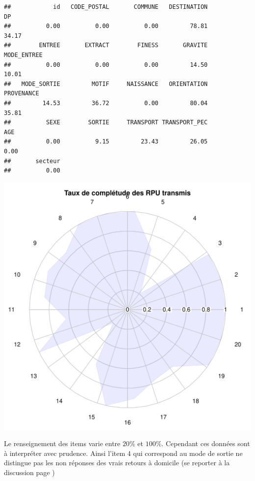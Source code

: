 \documentclass[12pt,english,french,twoside]{report}\usepackage[]{graphicx}\usepackage[]{color}
\makeatletter
\def\maxwidth{ %
  \ifdim\Gin@nat@width>\linewidth
    \linewidth
  \else
    \Gin@nat@width
  \fi
}
\newenvironment{kframe}{%
 \def\at@end@of@kframe{}%
 \ifinner\ifhmode%
  \def\at@end@of@kframe{\end{minipage}}%
  \begin{minipage}{\columnwidth}%
 \fi\fi%
 \def\FrameCommand##1{\hskip\@totalleftmargin \hskip-\fboxsep
 \colorbox{shadecolor}{##1}\hskip-\fboxsep
     \hskip-\linewidth \hskip-\@totalleftmargin \hskip\columnwidth}%
 \MakeFramed {\advance\hsize-\width
   \@totalleftmargin\z@ \linewidth\hsize
   \@setminipage}}%
 {\par\unskip\endMakeFramed%
 \at@end@of@kframe}
\newenvironment{knitrout}{}{} %
\makeatother
\begin{document}
\begin{knitrout}
\color{fgcolor}\begin{kframe}
\begin{verbatim}
##            id   CODE_POSTAL       COMMUNE   DESTINATION            DP 
##          0.00          0.00          0.00         78.81         34.17 
##        ENTREE       EXTRACT        FINESS       GRAVITE   MODE_ENTREE 
##          0.00          0.00          0.00         14.50         10.01 
##   MODE_SORTIE         MOTIF     NAISSANCE   ORIENTATION    PROVENANCE 
##         14.53         36.72          0.00         80.04         35.81 
##          SEXE        SORTIE     TRANSPORT TRANSPORT_PEC           AGE 
##          0.00          9.15         23.43         26.05          0.00 
##       secteur 
##          0.00
\end{verbatim}
\end{kframe}
\includegraphics[width=\maxwidth]{figure/radar} 

\end{knitrout}


Le renseignement des items varie entre $20\%$ et $100\%$. Cependant ces données sont à interpréter avec prudence. Ainsi l'item 4 qui correspond au mode de sortie ne distingue pas les non réponses des vrais retours à domicile (se reporter à la discussion page \pageref{ref:sortie})
\end{document}
